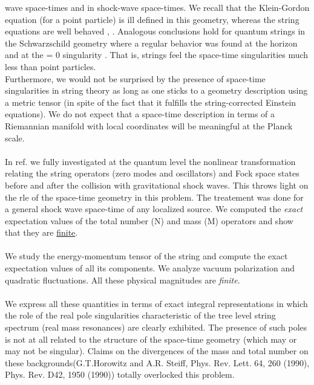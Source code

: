 \documentclass[12pt,a4paper]{article}
\begin{document}
wave space-times and in shock-wave space-times. We recall that the 
Klein-Gordon equation (for a point particle) is ill defined in this geometry, 
whereas the string equations are well behaved \cite{vs5}, \cite{vs6}. 
Analogous conclusions hold for quantum strings in the Schwarzschild 
geometry where a regular behavior was found at the horizon and at the 
\coordHE{} = 0 singularity \cite{vs7}. That is, strings feel the space-time 
singularities much less than point particles. \\
Furthermore, we would not be surprised by the presence of space-time 
singularities in string theory as long as one sticks to a geometry 
description using a metric tensor \coordHE{} (in spite of the fact that 
it fulfills the string-corrected Einstein equations). We do not expect that 
a space-time description in terms of a Riemannian manifold with local 
coordinates \coordHE{} will be meaningful at the Planck scale. \\ \\
In ref. \cite{vs8} we fully investigated at the quantum level the nonlinear 
transformation relating the string operators (zero modes and oscillators) 
and Fock space states before and after the collision with gravitational 
shock waves. This throws light on the r\coordHE{}le of the space-time 
geometry in this problem. The treatement was done for a general shock wave 
space-time of any localized source. We computed the {\it exact} 
expectation values of the total number (N) and mass (M\coordHE{}) operators and 
show that they are \underline{finite}.\\ \\ We study the energy-momentum tensor 
of the string and compute the exact expectation values of all its 
components. We analyze vacuum polarization and quadratic fluctuations. All 
these physical magnitudes are {\it finite}.\\ \\ We express all these
quantities in 
terms of exact integral representations in which the role of the real pole 
singularities characteristic of the tree level string spectrum (real mass 
resonances) are clearly exhibited. The presence of such poles is not at all 
related to the structure of the space-time geometry (which may or may not 
be singular). Claims on the divergences of the mass \coordHE{} 
and total number \coordHE{} on these backgrounds(G.T.Horowitz and A.R. Steiff, Phys. Rev. Lett. 64, 260 (1990), Phys. Rev. D42, 1950 (1990)) 
totally overlocked this problem.  
\end{document}

